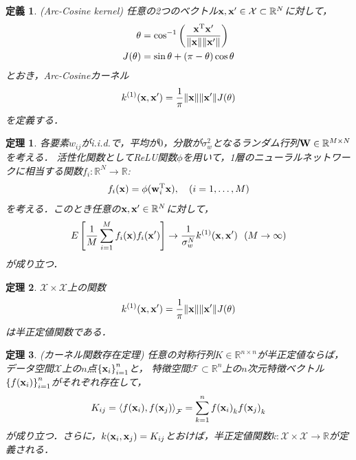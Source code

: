 \documentclass[11pt,a4j]{article}
\newtheorem{dfn}{定義}
\newtheorem{thm}{定理}
\begin{document}
        \begin{dfn}
          (Arc-Cosine kernel)
          任意の2つのベクトル${\bf x}, {\bf x}' \in \mathcal{X} \subset \mathbb{R}^{N}$に対して，
          \begin{align}
            \theta &= {\cos}^{-1} \left( \frac{{\bf x}^{\mathrm{T}} {\bf x}'}{ \|{\bf x}\| \|{\bf x}'\| } \right) \\
            J(\theta) &= \sin \theta + (\pi - \theta) \cos \theta
          \end{align}
          とおき，Arc-Cosineカーネル
          \begin{align}
            k^{(1)}({\bf x}, {\bf x}') = \frac{1}{\pi} \| {\bf x} \| \| {\bf x}' \| J(\theta) 
          \end{align}
          を定義する．
        \end{dfn}

        \begin{thm}\label{thm:clt_dnn}
          各要素$w_{ij}$がi.i.d.で，平均が$0$，分散が$\sigma_w^2$となるランダム行列${\bf W} \in \mathbb{R}^{M \times N}$を考える．
          活性化関数としてReLU関数$\phi$を用いて，1層のニューラルネットワークに相当する関数$f_i:\mathbb{R}^{N} \to \mathbb{R}$:
          \begin{align}
            f_i({\bf x}) = \phi({\bf w}_i^{\mathrm{T}} {\bf x}), ~~~ (i=1 ,\dots, M)
          \end{align}
          を考える．このとき任意の${\bf x}, {\bf x}' \in \mathbb{R}^{N}$に対して，
          \begin{align}
            E \left[ \frac{1}{M} \sum_{i=1}^{M} f_i({\bf x}) f_i({\bf x}') \right] \to
            \frac{1}{\sigma_w^N} k^{(1)}({\bf x}, {\bf x}') ~~ (M \to \infty)
          \end{align}
          が成り立つ．
        \end{thm}

        \begin{thm}\label{thm:semi_positive}
          $\mathcal{X} \times \mathcal{X}$上の関数
          \begin{align}
            k^{(1)}({\bf x},{\bf x}') = \frac{1}{\pi} \| {\bf x} \| \| {\bf x}' \| J(\theta) \label{form:dnn_kernel}
          \end{align}
          は半正定値関数である．
        \end{thm}

        \begin{thm}\label{thm:kernel_matrix_positive}
          (カーネル関数存在定理)
          任意の対称行列$K \in \mathbb{R}^{n \times n} $が半正定値ならば，
          データ空間$\mathcal{X}$上の$n$点${ \{ {\bf x}_i \} }_{i=1}^{n}$と，
          特徴空間$\mathcal{F} \subset \mathbb{R}^{n}$上の$n$次元特徴ベクトル${ \{ f({\bf x}_i) \} }_{i=1}^{n}$がそれぞれ存在して，
          \begin{align}
            K_{ij} = {\langle f({\bf x}_i), f({\bf x}_j) \rangle}_{\mathcal{F}} = \sum_{k=1}^{n} {f({\bf x}_i)}_k {f({\bf x}_j)}_k 
          \end{align}
          が成り立つ．さらに，$k({\bf x}_i, {\bf x}_j) = K_{ij}$とおけば，半正定値関数$k: \mathcal{X} \times \mathcal{X} \to \mathbb{R}$が定義される．
        \end{thm}
\end{document}
